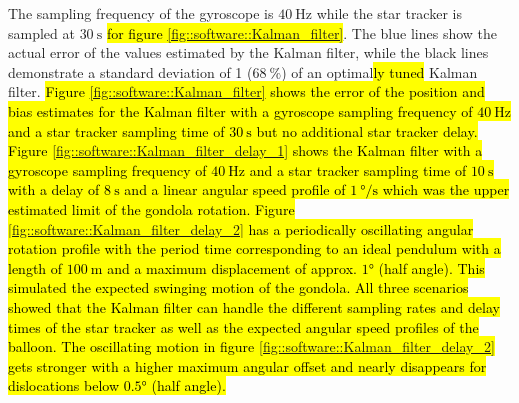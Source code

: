 The sampling frequency of the gyroscope is $\SI{40}{\Hz}$ while the star tracker is sampled at $\SI{30}{\second}$ \hl{for figure \mbox{\ref{fig::software::Kalman_filter}}}. The blue lines show the actual error of the values estimated by the Kalman filter, while the black lines demonstrate a standard deviation of 1 ($\SI{68}{\percent}$) of an optimal\hl{ly tuned} Kalman filter. 
\hl{Figure \mbox{\ref{fig::software::Kalman_filter}} shows the error of the position and bias estimates for the Kalman filter with a gyroscope sampling frequency of $\SI{40}{\Hz}$ and a star tracker sampling time of $\SI{30}{\second}$ but no additional star tracker delay. Figure \mbox{\ref{fig::software::Kalman_filter_delay_1}} shows the Kalman filter with a gyroscope sampling frequency of $\SI{40}{\Hz}$ and a star tracker sampling time of $\SI{10}{\second}$ with a delay of $\SI{8}{\s}$ and a linear angular speed profile of $\SI{1}{\degree\per\s}$ which was the upper estimated limit of the gondola rotation. Figure \mbox{\ref{fig::software::Kalman_filter_delay_2}} has a periodically oscillating angular rotation profile with the period time corresponding to an ideal pendulum with a length of $\SI{100}{\m}$ and a maximum displacement of approx. $\ang{1}$ (half angle). This simulated the expected swinging motion of the gondola. All three scenarios showed that the Kalman filter can handle the different sampling rates and delay times of the star tracker as well as the expected angular speed profiles of the balloon. The oscillating motion in figure \mbox{\ref{fig::software::Kalman_filter_delay_2}} gets stronger with a higher maximum angular offset and nearly disappears for dislocations below $\ang{0.5}$ (half angle).  }

